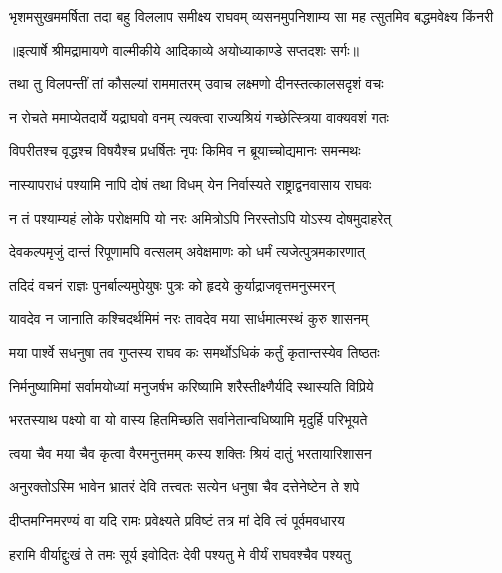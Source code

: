 \fourlineindentedshloka
{भृशमसुखममर्षिता तदा}
{ बहु विललाप समीक्ष्य राघवम्}
{व्यसनमुपनिशाम्य सा मह}
{त्सुतमिव बद्धमवेक्ष्य किंनरी} %


{॥इत्यार्षे श्रीमद्रामायणे वाल्मीकीये आदिकाव्ये अयोध्याकाण्डे सप्तदशः सर्गः॥}


\twolineshloka
{तथा तु विलपन्तीं तां कौसल्यां राममातरम्}
{उवाच लक्ष्मणो दीनस्तत्कालसदृशं वचः} %

\twolineshloka
{न रोचते ममाप्येतदार्ये यद्राघवो वनम्}
{त्यक्त्वा राज्यश्रियं गच्छेत्स्त्रिया वाक्यवशं गतः} %

\twolineshloka
{विपरीतश्च वृद्धश्च विषयैश्च प्रधर्षितः}
{नृपः किमिव न ब्रूयाच्चोद्यमानः समन्मथः} %

\twolineshloka
{नास्यापराधं पश्यामि नापि दोषं तथा विधम्}
{येन निर्वास्यते राष्ट्राद्वनवासाय राघवः} %

\twolineshloka
{न तं पश्याम्यहं लोके परोक्षमपि यो नरः}
{अमित्रोऽपि निरस्तोऽपि योऽस्य दोषमुदाहरेत्} %

\twolineshloka
{देवकल्पमृजुं दान्तं रिपूणामपि वत्सलम्}
{अवेक्षमाणः को धर्मं त्यजेत्पुत्रमकारणात्} %

\twolineshloka
{तदिदं वचनं राज्ञः पुनर्बाल्यमुपेयुषः}
{पुत्रः को हृदये कुर्याद्राजवृत्तमनुस्मरन्} %

\twolineshloka
{यावदेव न जानाति कश्चिदर्थमिमं नरः}
{तावदेव मया सार्धमात्मस्थं कुरु शासनम्} %

\twolineshloka
{मया पार्श्वे सधनुषा तव गुप्तस्य राघव}
{कः समर्थोऽधिकं कर्तुं कृतान्तस्येव तिष्ठतः} %

\twolineshloka
{निर्मनुष्यामिमां सर्वामयोध्यां मनुजर्षभ}
{करिष्यामि शरैस्तीक्ष्णैर्यदि स्थास्यति विप्रिये} %

\twolineshloka
{भरतस्याथ पक्ष्यो वा यो वास्य हितमिच्छति}
{सर्वानेतान्वधिष्यामि मृदुर्हि परिभूयते} %

\twolineshloka
{त्वया चैव मया चैव कृत्वा वैरमनुत्तमम्}
{कस्य शक्तिः श्रियं दातुं भरतायारिशासन} %

\twolineshloka
{अनुरक्तोऽस्मि भावेन भ्रातरं देवि तत्त्वतः}
{सत्येन धनुषा चैव दत्तेनेष्टेन ते शपे} %

\twolineshloka
{दीप्तमग्निमरण्यं वा यदि रामः प्रवेक्ष्यते}
{प्रविष्टं तत्र मां देवि त्वं पूर्वमवधारय} %

\twolineshloka
{हरामि वीर्याद्दुःखं ते तमः सूर्य इवोदितः}
{देवी पश्यतु मे वीर्यं राघवश्चैव पश्यतु} %

